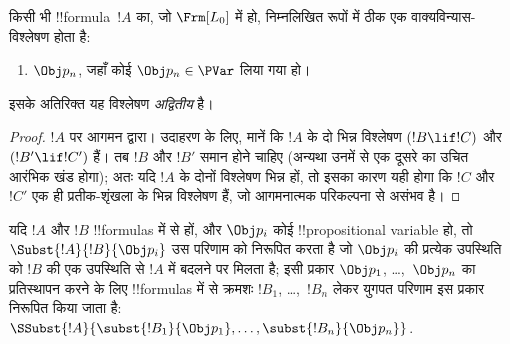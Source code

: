\documentclass[../../../include/open-logic-section]{subfiles}
\begin{document}
\begin{prop}[अद्वितीय पठनीयता]
किसी भी !!{formula}~$!A$ का, जो $ \Frm[L_0]$ में हो, निम्नलिखित रूपों में
ठीक एक वाक्यविन्यास-विश्लेषण होता है:
\begin{enumerate}


\item $\Obj p_n$, जहाँ कोई $\Obj p_n \in  \PVar$ लिया गया हो।
  




\end{enumerate}
इसके अतिरिक्त यह विश्लेषण \emph{अद्वितीय} है।
\end{prop}

\begin{proof}
$!A$ पर आगमन द्वारा। उदाहरण के लिए, मानें कि $!A$ के दो भिन्न विश्लेषण
$(!B \lif !C)$ और $(!B' \lif !C')$ हैं। तब $!B$ और $!B'$ समान होने चाहिए
(अन्यथा उनमें से एक दूसरे का उचित आरंभिक खंड होगा); अतः यदि $!A$ के दोनों
विश्लेषण भिन्न हों, तो इसका कारण यही होगा कि $!C$ और $!C'$ एक ही
प्रतीक-शृंखला के भिन्न विश्लेषण हैं, जो आगमनात्मक परिकल्पना से असंभव है।
\end{proof}


\begin{defn}[एकसमान प्रतिस्थापन]
यदि $!A$ और $!B$ !!{formula}s में से हों, और $\Obj p_i$ कोई !!{propositional
variable} हो, तो $\Subst{!A}{!B}{\Obj p_i}$ उस परिणाम को निरूपित करता है जो
$\Obj p_i$ की प्रत्येक उपस्थिति को $!B$ की एक उपस्थिति से $!A$ में बदलने पर
मिलता है; इसी प्रकार $\Obj p_1$, \dots,~$\Obj p_n$ का प्रतिस्थापन करने के लिए
!!{formula}s में से क्रमशः $!B_1$, \dots,~$!B_n$ लेकर युगपत परिणाम इस प्रकार
निरूपित किया जाता है:
$\SSubst{!A}{\subst{!B_1}{\Obj p_1},\dots,\subst{!B_n}{\Obj p_n}}$.
\end{defn}
\end{document}
